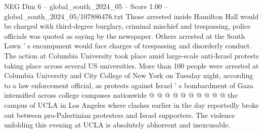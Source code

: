 \begin{textsample}{NEG Dim 6 – global\_south\_2024\_05 – Score 1.00 – global\_south\_2024\_05/107886476.txt}
Those arrested inside Hamilton Hall would be charged with third-degree burglary, criminal mischief and trespassing, police officials was quoted as saying by the newspaper.
Others arrested at the South Lawn ' s encampment would face charges of trespassing and disorderly conduct.
The action at Columbia University took place amid large-scale anti-Israel protests taking place across several US universities.
More than 100 people were arrested at Columbia University and City College of New York on Tuesday night, according to a law enforcement official, as protests against Israel ' s bombardment of Gaza intensified across college campuses nationwide @ @ @ @ @ @ @ @ @ @ the campus of UCLA in Los Angeles where clashes earlier in the day reportedly broke out between pro-Palestinian protesters and Israel supporters.
The violence unfolding this evening at UCLA is absolutely abhorrent and inexcusable.

\end{textsample}

